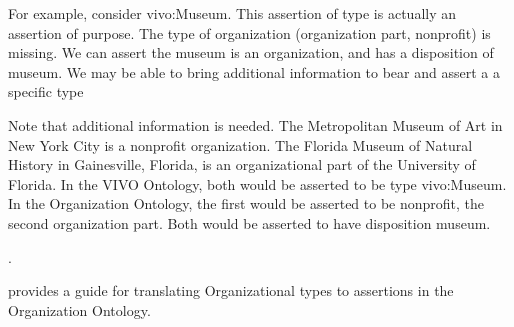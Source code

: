 \documentclass[letterpaper,10pt,english]{sphinxmanual}
\begin{document}
\sphinxAtStartPar
For example, consider vivo:Museum.  This assertion of type is actually an
assertion of purpose.  The type of organization (organization part, nonprofit) is
missing.  We can assert the museum is an organization, and has a disposition of
museum.  We may be able to bring additional information to bear and assert a
a specific type %
\begin{footnote}[2]\sphinxAtStartFootnote
Note that additional information is needed.  The Metropolitan Museum of Art
in New York City is a nonprofit organization.  The Florida Museum of Natural
History in Gainesville, Florida, is an organizational part of the University of
Florida.  In the VIVO
Ontology, both would be asserted to be type vivo:Museum.  In the Organization
Ontology, the first would be asserted to be nonprofit, the second organization
part.  Both would be asserted to have disposition museum.
%
\end{footnote}.

\sphinxAtStartPar
{\hyperref[\detokenize{vivo-to-org:table-17}]{}} provides a guide for translating Organizational types to assertions
in the Organization Ontology.
\end{document}
